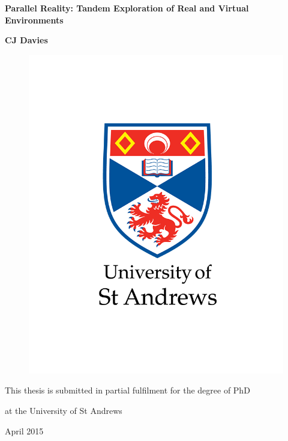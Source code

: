 \documentclass[a4paper]{report}
\begin{document}


\thispagestyle{empty}

\begin{center}
	\textbf{\Huge{Parallel Reality: Tandem Exploration of Real and Virtual Environments}}
\end{center}

\vspace{15mm}

\begin{center}
	\textbf{\Huge{CJ Davies}}
\end{center}

\begin{figure}[h]
	\begin{center}
		\includegraphics[width=.6\textwidth]{crest.png}
	\end{center}
\end{figure}

\begin{center}
	\Large{This thesis is submitted in partial fulfilment for the degree of PhD
	
	at the University of St Andrews}
\end{center}

\vspace{2mm}

\begin{center}
	\Large{April 2015}
\end{center}

\end{document}
